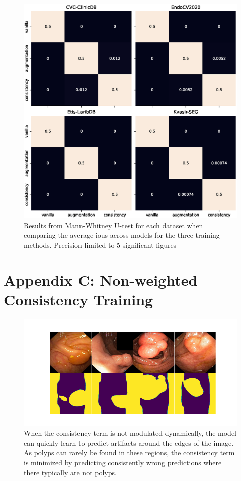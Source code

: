 \begin{figure}[htb]
    \centering
    \includegraphics[width=\linewidth]{illustrations/ensemble_relative_pvals.eps}
    \caption[Mann-Whitney U-test results ensembles]{Results from Mann-Whitney U-test for each dataset when comparing the average \glspl{iou} across models for the three training methods. Precision limited to 5 significant figures}
    \label{fig:ttest_training_methods_ensembles}
\end{figure}
    

\newpage
\chapter*{Appendix C: Non-weighted Consistency Training}\label{non_weighted_ctraining}

\begin{figure}[htb]
    \centering
    \includegraphics[width=\linewidth]{illustrations/artefacts.png}
    \caption[Unweighted Consistency example]{When the consistency term is not modulated dynamically, the model can quickly learn to predict artifacts around the edges of the image. As polyps can rarely be found in these regions, the consistency term is minimized by predicting consistently wrong predictions where there typically are not polyps. }
    \label{fig:non_weighted_ctraining}
\end{figure}

